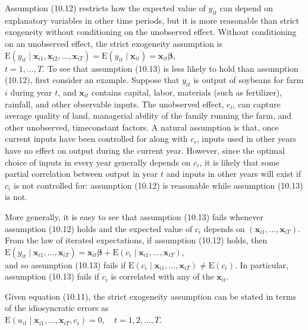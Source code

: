 \documentclass[10pt]{article}
\begin{document}
Assumption (10.12) restricts how the expected value of $y_{i t}$ can depend on explanatory variables in other time periods, but it is more reasonable than strict exogeneity without conditioning on the unobserved effect. Without conditioning on an unobserved effect, the strict exogeneity assumption is\\
$\mathrm{E}\left(y_{i t} \mid \mathbf{x}_{i 1}, \mathbf{x}_{i 2}, \ldots, \mathbf{x}_{i T}\right)=\mathrm{E}\left(y_{i t} \mid \mathbf{x}_{i t}\right)=\mathbf{x}_{i t} \boldsymbol{\beta}$,\\
$t=1, \ldots, T$. To see that assumption (10.13) is less likely to hold than assumption (10.12), first consider an example. Suppose that $y_{i t}$ is output of soybeans for farm $i$ during year $t$, and $\mathbf{x}_{i t}$ contains capital, labor, materials (such as fertilizer), rainfall, and other observable inputs. The unobserved effect, $c_{i}$, can capture average quality of land, managerial ability of the family running the farm, and other unobserved, timeconstant factors. A natural assumption is that, once current inputs have been controlled for along with $c_{i}$, inputs used in other years have no effect on output during the current year. However, since the optimal choice of inputs in every year generally depends on $c_{i}$, it is likely that some partial correlation between output in year $t$ and inputs in other years will exist if $c_{i}$ is not controlled for: assumption (10.12) is reasonable while assumption (10.13) is not.

More generally, it is easy to see that assumption (10.13) fails whenever assumption (10.12) holds and the expected value of $c_{i}$ depends on $\left(\mathbf{x}_{i 1}, \ldots, \mathbf{x}_{i T}\right)$. From the law of iterated expectations, if assumption (10.12) holds, then\\
$\mathrm{E}\left(y_{i t} \mid \mathbf{x}_{i 1}, \ldots, \mathbf{x}_{i T}\right)=\mathbf{x}_{i t} \boldsymbol{\beta}+\mathrm{E}\left(c_{i} \mid \mathbf{x}_{i 1}, \ldots, \mathbf{x}_{i T}\right)$,\\
and so assumption (10.13) fails if $\mathrm{E}\left(c_{i} \mid \mathbf{x}_{i 1}, \ldots, \mathbf{x}_{i T}\right) \neq \mathrm{E}\left(c_{i}\right)$. In particular, assumption (10.13) fails if $c_{i}$ is correlated with any of the $\mathbf{x}_{i t}$.

Given equation (10.11), the strict exogeneity assumption can be stated in terms of the idiosyncratic errors as\\
$\mathrm{E}\left(u_{i t} \mid \mathbf{x}_{i 1}, \ldots, \mathbf{x}_{i T}, c_{i}\right)=0, \quad t=1,2, \ldots, T$.
\end{document}
